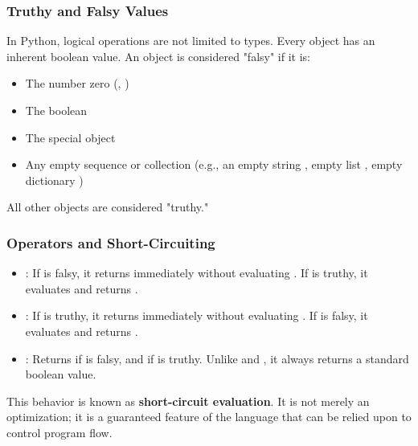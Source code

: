 \subsubsection*{Truthy and Falsy Values}
In Python, logical operations are not limited to  types. Every object has an inherent boolean value. An object is considered "falsy" if it is:
\begin{itemize}
    \item The number zero (, )
    \item The boolean 
    \item The special object 
    \item Any empty sequence or collection (e.g., an empty string , empty list \code{[]}, empty dictionary \code{{}})
\end{itemize}
All other objects are considered "truthy."

\subsubsection*{Operators and Short-Circuiting}
\begin{itemize}
    \item {}: If  is falsy, it returns  immediately without evaluating . If  is truthy, it evaluates and returns .
    \item {}: If  is truthy, it returns  immediately without evaluating . If  is falsy, it evaluates and returns .
    \item {}: Returns  if  is falsy, and  if  is truthy. Unlike  and , it always returns a standard boolean value.
\end{itemize}
This behavior is known as \textbf{short-circuit evaluation}. It is not merely an optimization; it is a guaranteed feature of the language that can be relied upon to control program flow.

